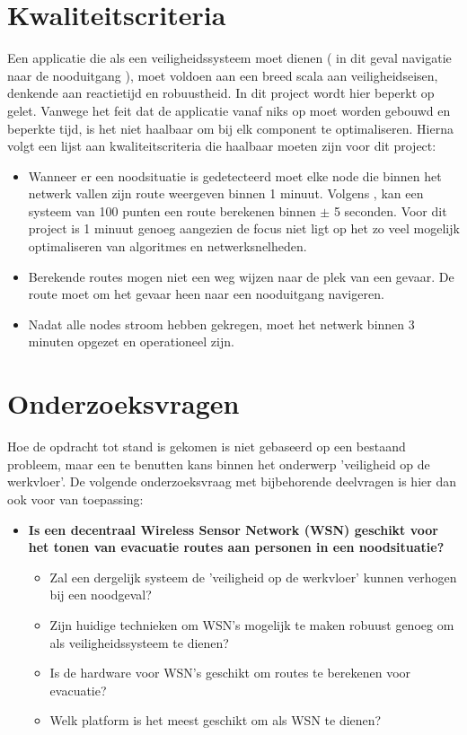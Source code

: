 \documentclass{../local}
\begin{document}
\section{Kwaliteitscriteria}
Een applicatie die als een veiligheidssysteem moet dienen ( in dit geval navigatie naar de nooduitgang ), moet voldoen aan een breed scala aan veiligheidseisen, denkende aan reactietijd en robuustheid. In dit project wordt hier beperkt op gelet. Vanwege het feit dat de applicatie vanaf niks op moet worden gebouwd en beperkte tijd, is het niet haalbaar om bij elk component te optimaliseren. Hierna volgt een lijst aan kwaliteitscriteria die haalbaar moeten zijn voor dit project:

\begin{itemize}
\item Wanneer er een noodsituatie is gedetecteerd moet elke node die binnen het netwerk vallen zijn route  weergeven binnen 1 minuut. Volgens \cite{BarnesEmEv}, kan een systeem van 100 punten een route berekenen binnen $\pm$ 5 seconden. Voor dit project is 1 minuut genoeg aangezien de focus niet ligt op het zo veel mogelijk optimaliseren van algoritmes en netwerksnelheden.
\item Berekende routes mogen niet een weg wijzen naar de plek van een gevaar. De route moet om het gevaar heen naar een nooduitgang navigeren.
\item Nadat alle nodes stroom hebben gekregen, moet het netwerk binnen 3 minuten opgezet en operationeel zijn.
\end{itemize}

\section{Onderzoeksvragen}
Hoe de opdracht tot stand is gekomen is niet gebaseerd op een bestaand probleem, maar een te benutten kans binnen het onderwerp 'veiligheid op de werkvloer'. De volgende onderzoeksvraag met bijbehorende deelvragen is hier dan ook voor van toepassing:

\begin{itemize}
\item \textbf{Is een decentraal Wireless Sensor Network (WSN) geschikt voor het tonen van evacuatie routes aan personen in een noodsituatie?} 
\begin{itemize}
\item Zal een dergelijk systeem de 'veiligheid op de werkvloer' kunnen verhogen bij een noodgeval?
\item Zijn huidige technieken om WSN's mogelijk te maken robuust genoeg om als veiligheidssysteem te dienen?
\item Is de hardware voor WSN's geschikt om routes te berekenen voor evacuatie?
\item Welk platform is het meest geschikt om als WSN te dienen?
\end{itemize}
\end{itemize}
\end{document}

